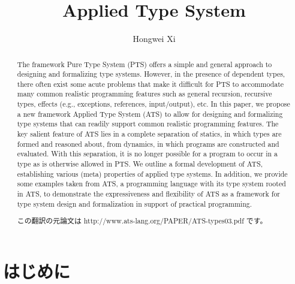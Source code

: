 \documentclass[submit,techreq,noauthor]{ipsj}
\begin{document}
\title{Applied Type System}

\author{Hongwei Xi}{}{}

\begin{abstract}
The framework Pure Type System (PTS) offers a simple and general approach to designing and formalizing type systems. However, in the presence of dependent types, there often exist some acute problems that make it difficult for PTS to accommodate many common realistic programming features such as general recursion, recursive types, effects (e.g., exceptions, references, input/output), etc. In this paper, we propose a new framework Applied Type System (ATS) to allow for designing and formalizing type systems that can readily support common realistic programming features. The key salient feature of ATS lies in a complete separation of statics, in which types are formed and reasoned about, from dynamics, in which programs are constructed and evaluated. With this separation, it is no longer possible for a program to occur in a type as is otherwise allowed in PTS. We outline a formal development of ATS, establishing various (meta) properties of applied type systems. In addition, we provide some examples taken from ATS, a programming language with its type system rooted in ATS, to demonstrate the expressiveness and flexibility of ATS as a framework for type system design and formalization in support of practical programming.

この翻訳の元論文は http://www.ats-lang.org/PAPER/ATS-types03.pdf です。
\end{abstract}

\maketitle
\thispagestyle{empty}

\section{はじめに}


\begin{acknowledgment}
\end{acknowledgment}

\begin{thebibliography}{10}
\end{thebibliography}
\end{document}
